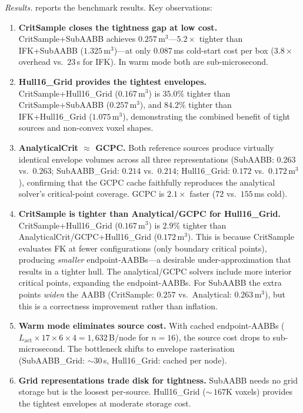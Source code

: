 \documentclass[journal]{IEEEtran}
\begin{document}
\emph{Results.}
 reports the benchmark results.
Key observations:

\begin{enumerate}
\item \textbf{CritSample closes the tightness gap at low cost.}
  CritSample+SubAABB achieves $0.257$\,m$^3$---$5.2{\times}$ tighter
  than IFK+SubAABB ($1.325$\,m$^3$)---at only $0.087$\,ms
  cold-start cost per box ($3.8{\times}$ overhead vs.\
  $23$\,\textmu s for IFK).
  In warm mode both are sub-microsecond.

\item \textbf{Hull16\_Grid provides the tightest envelopes.}
  CritSample+Hull16\_Grid ($0.167$\,m$^3$) is $35.0\%$ tighter
  than CritSample+SubAABB ($0.257$\,m$^3$), and
  $84.2\%$ tighter than IFK+Hull16\_Grid ($1.075$\,m$^3$),
  demonstrating the combined benefit of tight sources
  and non-convex voxel shapes.

\item \textbf{AnalyticalCrit $\approx$ GCPC.}
  Both reference sources produce virtually identical
  envelope volumes across all three representations
  (SubAABB: $0.263$ vs.\ $0.263$;
   SubAABB\_Grid: $0.214$ vs.\ $0.214$;
   Hull16\_Grid: $0.172$ vs.\ $0.172$\,m$^3$),
  confirming that the GCPC cache faithfully reproduces
  the analytical solver's critical-point coverage.
  GCPC is $2.1{\times}$ faster ($72$ vs.\ $155$\,ms cold).

\item \textbf{CritSample is tighter than Analytical/GCPC for Hull16\_Grid.}
  CritSample+Hull16\_Grid ($0.167$\,m$^3$) is $2.9\%$ tighter
  than AnalyticalCrit/GCPC+Hull16\_Grid ($0.172$\,m$^3$).
  This is because CritSample evaluates FK at fewer configurations
  (only boundary critical points), producing \emph{smaller}
  endpoint-AABBs---a desirable under-approximation that
  results in a tighter hull.
  The analytical/GCPC solvers include more interior critical
  points, expanding the endpoint-AABBs.
  For SubAABB the extra points \emph{widen} the AABB
  (CritSample: $0.257$ vs.\ Analytical: $0.263$\,m$^3$),
  but this is a correctness improvement rather than inflation.

\item \textbf{Warm mode eliminates source cost.}
  With cached endpoint-AABBs ($L_\text{act} {\times} 17 {\times} 6 {\times} 4
  = 1{,}632$\,B/node for $n{=}16$), the source cost drops to
  sub-microsecond.
  The bottleneck shifts to envelope rasterisation
  (SubAABB\_Grid: ${\sim}30$\,\textmu s, Hull16\_Grid: cached per node).

\item \textbf{Grid representations trade disk for tightness.}
  SubAABB needs no grid storage but is the loosest per-source.
  Hull16\_Grid ($\sim$\,$167$K voxels) provides the tightest
  envelopes at moderate storage cost.
\end{enumerate}
\end{document}

